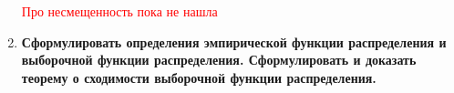 \documentclass[12pt]{report}
\begin{document}
\begin{enumerate}
	\textcolor{red}{Про несмещенность пока не нашла}
	
	\item \textbf{Сформулировать определения эмпирической функции распределения и выборочной функции
		распределения. Сформулировать и доказать теорему о сходимости выборочной функции распределения.}
	
	\begin{figure}[!h]
	\end{figure}
	\begin{figure}[!h]

\end{figure}
\end{enumerate}
\end{document}
